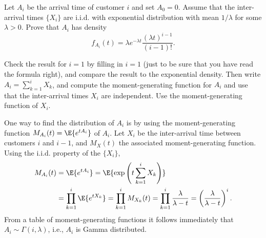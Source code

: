 \begin{extra}
 Let $A_i$ be the arrival time of customer $i$ and set $A_0=0$.
 Assume that the inter-arrival times $\{X_i\}$ are i.i.d.
 with exponential distribution with mean $1/\lambda$ for some $\lambda>0$.
 Prove that $A_i$ has density
\begin{equation*}
f_{A_i}(t) = \lambda e^{-\lambda t} \frac{(\lambda t)^{i-1}}{(i-1)!}.
\end{equation*}
\begin{hint}
 Check the result for $i=1$ by filling in $i=1$ (just to be
 sure that you have read the formula right), and compare the result
 to the exponential density. Then write $A_i =\sum_{k=1}^i X_k$, and compute the moment-generating function for $A_i$ and use that the inter-arrival times
 $X_i$ are independent. Use the moment-generating function of $X_i$.
\end{hint}
\begin{solution}
 One way to find the distribution of $A_i$ is by using the moment-generating function $M_{A_i}(t) = \E{e^{t A_i}}$ of $A_i$.
 Let $X_i$ be the inter-arrival time between customers $i$ and $i-1$, and $M_X(t)$ the associated moment-generating function.
 Using the i.i.d.
 property of the $\{X_i\}$,
\begin{align*}
 M_{A_i}(t) &= \E{e^{t A_i}} = \E{\exp\left(t\sum_{k=1}^{i} X_k\right)} \\
& = \prod_{k=1}^{i} \E{e^{tX_k}} = 
\prod_{k=1}^{i} M_{X_k}(t) = 
\prod_{k=1}^{i} \frac{\lambda}{\lambda -t }
 = \left(\frac{\lambda}{\lambda -t }\right)^i.
\end{align*}
From a table of moment-generating functions it follows immediately that
$A_i \sim \Gamma(i,\lambda)$, i.e., $A_i$ is Gamma distributed.
\end{solution}
\end{extra}


